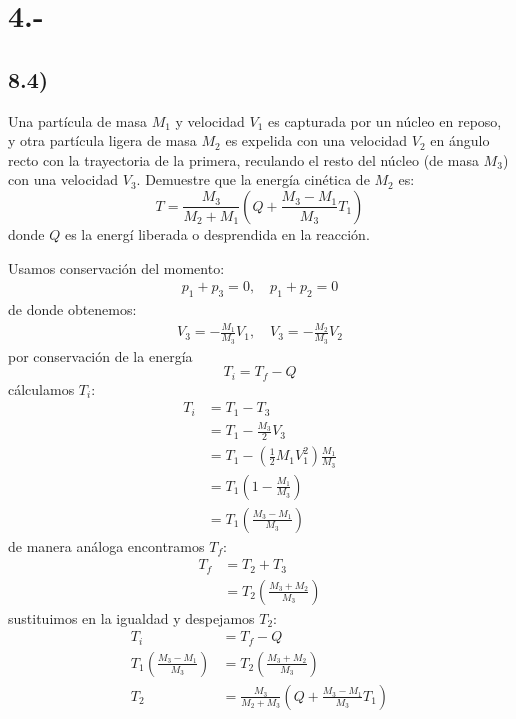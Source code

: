 \documentclass{article}
\begin{document}
\section*{4.-}
\subsection*{8.4)}
Una partícula de masa $M_1$ y velocidad $V_1$ es capturada por un núcleo en reposo,
y otra partícula ligera de masa $M_2$ es expelida con una velocidad $V_2$ en ángulo 
recto con la trayectoria de la primera, reculando el resto del núcleo (de masa $M_3$)
con una velocidad $V_3$. Demuestre que la energía cinética de $M_2$ es:
\[ T = \frac{M_3}{M_2+M_1} \left( Q + \frac{M_3-M_1}{M_3}T_1 \right) \]
donde $Q$ es la energí liberada o desprendida en la reacción.
\begin{tcolorbox}[breakable]
    Usamos conservación del momento:
    \begin{align*}
        p_1 + p_3 = 0, \quad p_1 + p_2 = 0
    \end{align*}
    de donde obtenemos:
    \begin{align*}
        V_3 = -\frac{M_1}{M_3}V_1, \quad V_3 = -\frac{M_2}{M_3}V_2
    \end{align*}
    por conservación de la energía 
    \[T_i = T_f-Q \] 
    cálculamos $T_i$:
    \begin{align*}
        T_i 
        &= T_1 - T_3 \\
        &= T_1 - \frac{M_3}{2}V_3 \\
        &= T_1 - \left( \frac{1}{2}M_1V_1^2 \right)\frac{M_1}{M_3} \\
        &= T_1\left( 1 - \frac{M_1}{M_3} \right) \\
        &= T_1\left( \frac{M_3-M_1}{M_3} \right)
    \end{align*}
    de manera análoga encontramos $T_f$:
    \begin{align*}
        T_f 
        &= T_2 + T_3 \\
        &= T_2\left( \frac{M_3+M_2}{M_3} \right)
    \end{align*}
    sustituimos en la igualdad y despejamos $T_2$:
    \begin{align*}
        T_i &= T_f-Q \\
        T_1\left( \frac{M_3-M_1}{M_3} \right) &= T_2\left( \frac{M_3+M_2}{M_3} \right) \\
        T_2 &= \frac{M_3}{M_2+M_3}\left( Q + \frac{M_3-M_1}{M_3}T_1 \right)
    \end{align*}
\end{tcolorbox}
\end{document}
